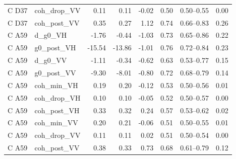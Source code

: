 \begin{tabular}{llrrrrcr}
C D37 & coh\_drop\_VV & 0.11 & 0.11 & -0.02 & 0.50 & 0.50--0.55 & 0.00 \\
C D37 & coh\_post\_VV & 0.35 & 0.27 & 1.12 & 0.74 & 0.66--0.83 & 0.26 \\
C A59 & d\_g0\_VH & -1.76 & -0.44 & -1.03 & 0.73 & 0.65--0.86 & 0.22 \\
C A59 & g0\_post\_VH & -15.54 & -13.86 & -1.01 & 0.76 & 0.72--0.84 & 0.23 \\
C A59 & d\_g0\_VV & -1.11 & -0.34 & -0.62 & 0.63 & 0.53--0.77 & 0.15 \\
C A59 & g0\_post\_VV & -9.30 & -8.01 & -0.80 & 0.72 & 0.68--0.79 & 0.14 \\
C A59 & coh\_min\_VH & 0.19 & 0.20 & -0.12 & 0.53 & 0.50--0.56 & 0.01 \\
C A59 & coh\_drop\_VH & 0.10 & 0.10 & -0.05 & 0.52 & 0.50--0.57 & 0.00 \\
C A59 & coh\_post\_VH & 0.33 & 0.32 & 0.24 & 0.57 & 0.53--0.62 & 0.02 \\
C A59 & coh\_min\_VV & 0.20 & 0.21 & -0.06 & 0.51 & 0.50--0.55 & 0.01 \\
C A59 & coh\_drop\_VV & 0.11 & 0.11 & 0.02 & 0.51 & 0.50--0.54 & 0.00 \\
C A59 & coh\_post\_VV & 0.38 & 0.33 & 0.73 & 0.68 & 0.61--0.79 & 0.12 \\
\bottomrule
\end{tabular}
